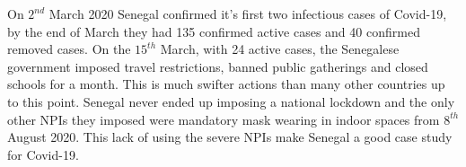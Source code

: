 \documentclass[11pt,a4paper]{article}
\theoremstyle{break}
\begin{document}

  On $2^{nd}$ March 2020 Senegal confirmed it's first two infectious cases of Covid-19, by the end of March they had 135 confirmed active cases and 40 confirmed removed cases. On the $15^{th}$ March, with 24 active cases, the Senegalese government imposed travel restrictions, banned public gatherings and closed schools for a month. This is much swifter actions than many other countries up to this point. Senegal never ended up imposing a national lockdown and the only other NPIs they imposed were mandatory mask wearing in indoor spaces from $8^{th}$ August 2020. This lack of using the severe NPIs make Senegal a good case study for Covid-19.

  \begin{figure}[H]
    \centering
\end{figure}
\end{document}
